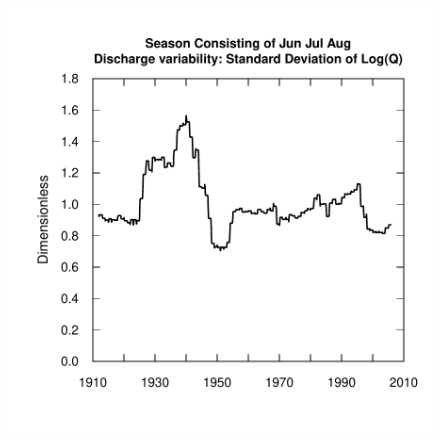 \documentclass[a4paper,11pt]{article}
\begin{document}
\begin{figure}[htbp]
  \begin{minipage}[h]{0.5\linewidth}
    \begin{center}

\includegraphics{EGRET-fig3a}
    \label{fig:SDRed1}
    \end{center}
  \end{minipage}
  \begin{minipage}[h]{0.5\linewidth}
    \begin{center}



\end{center}
\end{minipage}
\end{figure}
\end{document}
